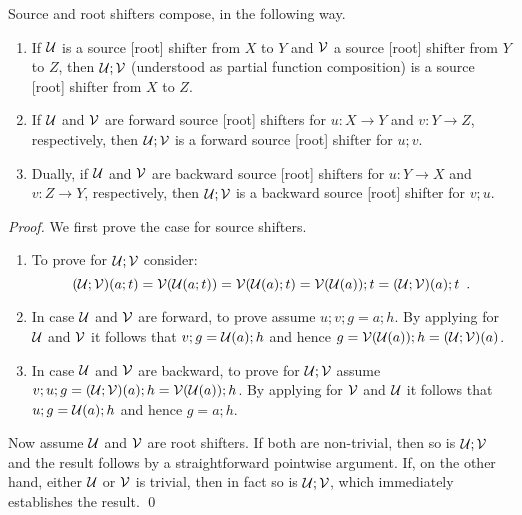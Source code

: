 %
Source and root shifters compose, in the following way.
%
\begin{proposition}
\begin{enumerate}[topsep=\smallskipamount]
\item If $\mathcal{U}$ is a source [root] shifter from $X$ to $Y$ and $\mathcal{V}$ a source [root] shifter from $Y$ to $Z$, then $\mathcal{U};\mathcal{V}$ (understood as partial function composition) is a source [root] shifter from $X$ to $Z$. 
\item If $\mathcal{U}$ and $\mathcal{V}$ are forward source [root] shifters for $u: X\to Y$ and $v: Y \to Z$, respectively, then $\mathcal{U};\mathcal{V}$ is a forward source [root] shifter for $u;v$.
\item Dually, if $\mathcal{U}$ and $\mathcal{V}$ are backward source [root] shifters for $u: Y\to X$ and $v: Z \to Y$, respectively, then $\mathcal{U};\mathcal{V}$ is a backward source [root] shifter for $v;u$.
\end{enumerate}
\end{proposition}

\begin{fullorname}
\begin{proof}
We first prove the case for source shifters.
\begin{enumerate}
\item To prove  for $\mathcal{U};\mathcal{V}$ consider:
\[ (\mathcal{U};\mathcal{V})(a;t) = \mathcal{V}(\mathcal{U}(a;t))= \mathcal{V}(\mathcal{U}(a);t)=\mathcal{V}(\mathcal{U}(a));t=(\mathcal{U};\mathcal{V})(a);t \enspace. \]

\item In case $\mathcal{U}$ and $\mathcal{V}$ are forward, to prove  assume $u;v;g=a;h$. By applying  for $\mathcal{U}$ and $\mathcal{V}$ it follows that $v;g=\mathcal{U}(a);h$ and hence $g=\mathcal{V}(\mathcal{U}(a));h=(\mathcal{U};\mathcal{V})(a)$.

\item In case $\mathcal{U}$ and $\mathcal{V}$ are backward, to prove  for $\mathcal{U};\mathcal{V}$ assume $v;u;g=(\mathcal{U};\mathcal{V})(a);h=\mathcal{V}(\mathcal{U}(a));h$. By applying  for $\mathcal{V}$ and $\mathcal{U}$ it follows that $u;g=\mathcal{U}(a);h$ and hence $g=a;h$.
\end{enumerate}
%
Now assume $\mathcal{U}$ and $\mathcal{V}$ are root shifters. If both are non-trivial, then so is $\mathcal{U};\mathcal{V}$ and the result follows by a straightforward pointwise argument. If, on the other hand, either $\mathcal{U}$ or $\mathcal{V}$ is trivial, then in fact so is $\mathcal{U};\mathcal{V}$, which immediately establishes the result.
\qed
\end{proof}
\end{fullorname}

